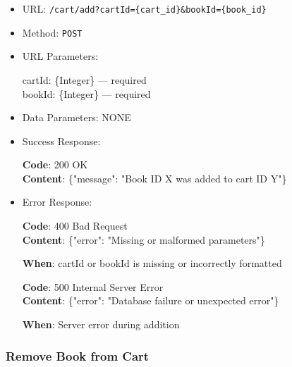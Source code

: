 \begin{itemize}
    \item URL: \texttt{/cart/add?cartId=\{cart\_id\}\&bookId=\{book\_id\}}
    \item Method: \texttt{POST}
    \item URL Parameters:

    cartId: \{Integer\} — required \\
    bookId: \{Integer\} — required

    \item Data Parameters: NONE

    \item Success Response: \newline

    \textbf{Code}: 200 OK \\
    \textbf{Content}: \{"message": "Book ID X was added to cart ID Y"\}

    \item Error Response: \newline

    \textbf{Code}: 400 Bad Request \\
    \textbf{Content}: \{"error": "Missing or malformed parameters"\}

    \textbf{When}: cartId or bookId is missing or incorrectly formatted \newline

    \textbf{Code}: 500 Internal Server Error \\
    \textbf{Content}: \{"error": "Database failure or unexpected error"\}

    \textbf{When}: Server error during addition
\end{itemize}

\subsubsection*{Remove Book from Cart}

